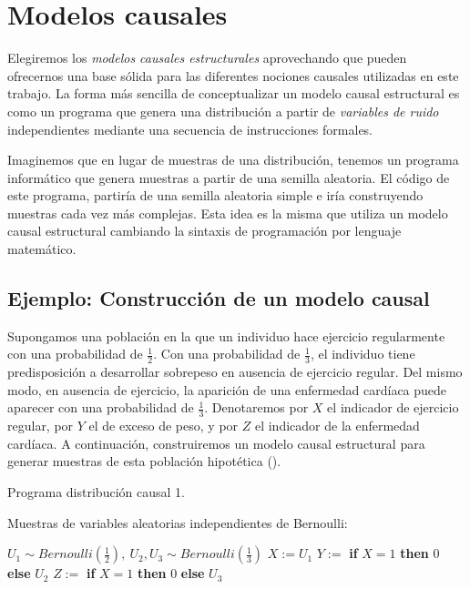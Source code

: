 \documentclass[oneside,openright,titlepage,numbers=noenddot,openany,headinclude,footinclude=true,
cleardoublepage=empty,abstractoff,BCOR=5mm,paper=a4,fontsize=12pt,main=spanish]{scrreprt}
\begin{document}
\section{Modelos causales}

Elegiremos los \textit{modelos causales estructurales} aprovechando que pueden ofrecernos una base sólida para las diferentes nociones causales utilizadas en este trabajo. La forma más sencilla de conceptualizar un modelo causal estructural es como un programa que genera una distribución a partir de \textit{variables de ruido} independientes mediante una secuencia de instrucciones formales. 

Imaginemos que en lugar de muestras de una distribución, tenemos un programa informático que genera muestras a partir de una semilla aleatoria. El código de este programa, partiría de una semilla aleatoria simple e iría construyendo muestras cada vez más complejas. Esta idea es la misma que utiliza un modelo causal estructural cambiando la sintaxis de programación por lenguaje matemático.

\subsection{Ejemplo: Construcción de un modelo causal} \label{subsec:sobrepeso}

Supongamos una población en la que un individuo hace ejercicio regularmente con una probabilidad de $\frac{1}{2}$. Con una probabilidad de $\frac{1}{3}$, el individuo tiene predisposición a desarrollar sobrepeso en ausencia de ejercicio regular. Del mismo modo, en ausencia de ejercicio, la aparición de una enfermedad cardíaca puede aparecer con una probabilidad de $\frac{1}{3}$. Denotaremos por $X$ el indicador de ejercicio regular, por $Y$ el de exceso de peso, y por $Z$ el indicador de la enfermedad cardíaca. A continuación, construiremos un modelo causal estructural para generar muestras de esta población hipotética (\cite{fairnesslearning2019}).

\clearpage

\begin{algorithm}[h]
\caption{Programa distribución causal 1.}
    Muestras de variables aleatorias independientes de Bernoulli:
    
    $U_1 \sim  Bernoulli\left(\frac{1}{2}\right), \ U_2,U_3 \sim  Bernoulli\left(\frac{1}{3}\right)$\;
    $X:=U_1$\;
    $Y:=$ \textbf{if} $X=1$ \textbf{then} $0$ \textbf{else} $U_2$\;
    $Z:=$ \textbf{if} $X=1$ \textbf{then} $0$ \textbf{else} $U_3$\;
    \label{alg:programa2}
\end{algorithm}
\end{document}

